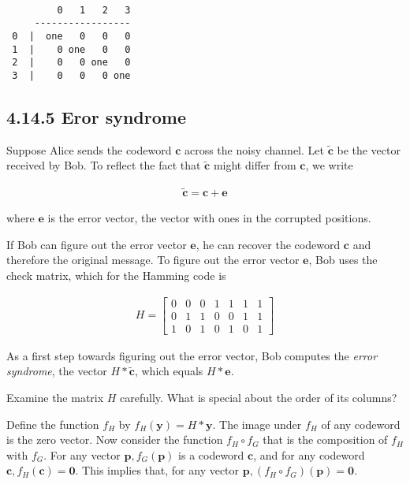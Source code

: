 \documentclass[
  letterpaper,
  DIV=11,
  numbers=noendperiod]{scrartcl}
\begin{document}
\begin{lstlisting}

         0   1   2   3
     -----------------
 0  |  one   0   0   0
 1  |    0 one   0   0
 2  |    0   0 one   0
 3  |    0   0   0 one
\end{lstlisting}

\newpage{}

\hypertarget{eror-syndrome}{%
\subsection{4.14.5 Eror syndrome}\label{eror-syndrome}}

Suppose Alice sends the codeword \(\bm{c}\) across the noisy channel.
Let \(\bm{\tilde{c}}\) be the vector received by Bob. To reflect the
fact that \(\bm{\tilde{c}}\) might differ from \(\bm{c}\), we write

\begin{align*}
\bm{\tilde{c} = c + e}
\end{align*}

where \(\bm{e}\) is the error vector, the vector with ones in the
corrupted positions.

If Bob can figure out the error vector \(\bm{e}\), he can recover the
codeword \(\bm{c}\) and therefore the original message. To figure out
the error vector \(\bm{e}\), Bob uses the check matrix, which for the
Hamming code is

\begin{align*}
H = \begin{bmatrix} 0 & 0 & 0 & 1 & 1 & 1 & 1\\ 0 & 1 & 1 & 0 & 0 & 1 & 1\\ 1 & 0 & 1 & 0 & 1 & 0 & 1 \end{bmatrix}
\end{align*}

As a first step towards figuring out the error vector, Bob computes the
\emph{error syndrome}, the vector \(H * \bm{\tilde{c}}\), which equals
\(H * \bm{e}\).

Examine the matrix \(H\) carefully. What is special about the order of
its columns?

Define the function \(f_H\) by \(f_H(\bm{y}) = H * \bm{y}\). The image
under \(f_H\) of any codeword is the zero vector. Now consider the
function \(f_H \circ f_G\) that is the composition of \(f_H\) with
\(f_G\). For any vector \(\bm{p}, f_G(\bm{p})\) is a codeword
\(\bm{c}\), and for any codeword \(\bm{c}, f_H(\bm{c}) = \bm{0}\). This
implies that, for any vector
\(\bm{p}, (f_H \circ f_G)(\bm{p}) = \bm{0}\).
\end{document}

